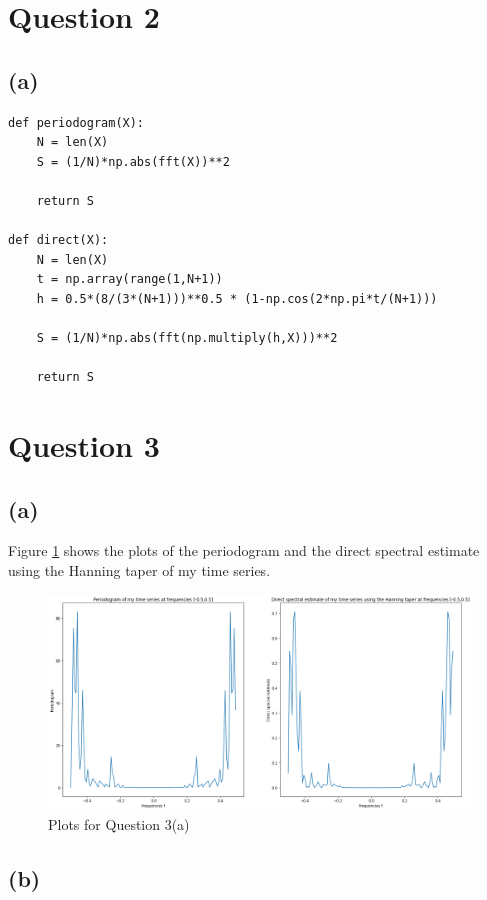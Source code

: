 \documentclass[a4paper,11pt]{article}
\theoremstyle{mytheor}
\begin{document}
\section*{Question 2}

\subsection{(a)}

\begin{lstlisting}
def periodogram(X):
    N = len(X)
    S = (1/N)*np.abs(fft(X))**2
    
    return S

def direct(X):
    N = len(X)
    t = np.array(range(1,N+1))
    h = 0.5*(8/(3*(N+1)))**0.5 * (1-np.cos(2*np.pi*t/(N+1)))
    
    S = (1/N)*np.abs(fft(np.multiply(h,X)))**2
    
    return S
\end{lstlisting}


\newpage

\section*{Question 3}
\subsection*{(a)}

Figure \ref{plot3a} shows the plots of the periodogram and the direct spectral estimate using the Hanning taper of my time series.

\begin{figure}[h!]
    \includegraphics[width=\columnwidth]{plot3a.png}
    \caption{Plots for Question 3(a)}
    \label{plot3a}
\end{figure}

\subsection*{(b)}
\end{document}
